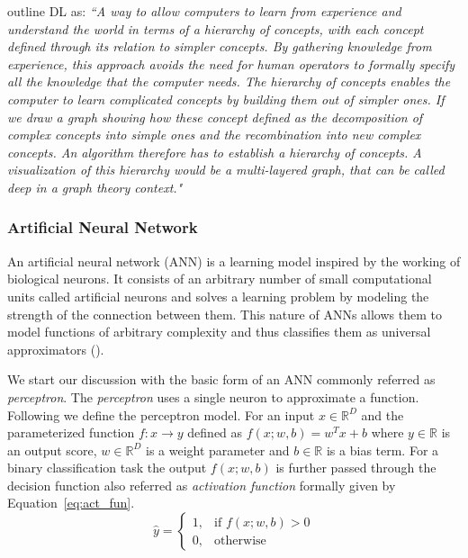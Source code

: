 \citet{Goodfellow-et-al-2016} outline DL as:
\textit{``A way to allow computers to learn from experience and understand the world in terms of a hierarchy of concepts, with each concept deﬁned through its relation to simpler concepts. By gathering knowledge from experience, this approach avoids the need for human operators to formally specify all the knowledge that the computer needs. The hierarchy of concepts enables the computer to learn complicated concepts by building them out of simpler ones. If we draw a graph showing how these concept defined as the decomposition of complex concepts into simple ones and the recombination into new complex concepts. An algorithm therefore has to establish a hierarchy of concepts. A visualization of this hierarchy would be a multi-layered graph, that can be called deep in a graph theory context."}

\subsubsection{Artificial Neural Network}
\label{sub:ann}
An artificial neural network (ANN) is a learning model inspired by the working of biological neurons. It consists of an arbitrary number of small computational units called artificial neurons and solves a learning problem by modeling the strength of the connection between them. This nature of ANNs allows them to model functions of arbitrary complexity and thus classifies them as universal approximators (\cite{hornik1989multilayer}).

We start our discussion with the basic form of an ANN commonly referred as \emph{perceptron}. The \emph{perceptron} uses a single neuron to approximate a function. Following \citet{mitchell1990machine} we define the perceptron model. For an input $x\in\mathbb{R}^D$ and the parameterized function $f:x\rightarrow y$ defined as $f(x;w,b)=w^Tx+b$ where  $y\in\mathbb{R}$ is an output score, $w\in\mathbb{R}^D$ is a weight parameter and $b\in\mathbb{R}$ is a bias term. For a binary classification task the output $f(x;w,b)$ is further passed through the decision function also referred as
\emph{activation function} formally given by Equation~\ref{eq:act_fun}. 
\begin{equation}
\label{eq:act_fun}
  \hat{y}= 
\begin{cases}
    1,& \text{if } f(x;w,b)> 0\\
    0,              & \text{otherwise}
\end{cases}  
\end{equation}

